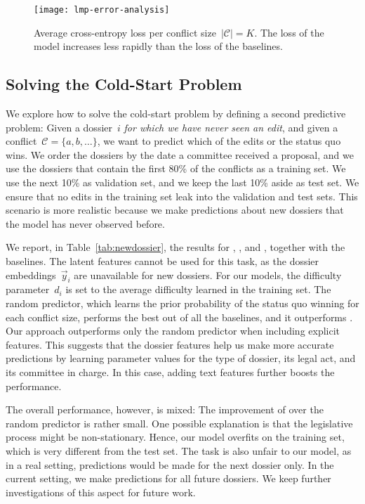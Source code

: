 \begin{figure}
  \centering
  \texttt{[image: lmp-error-analysis]}
	\caption{%
		Average cross-entropy loss per conflict size~$\vert \mathcal{C} \vert = K$.
		The loss of the  model increases less rapidly than the loss of the baselines.
	}
	\label{fig:error-analysis}
\end{figure}

\subsection{Solving the Cold-Start Problem}
\label{sec:cold-start}

We explore how to solve the cold-start problem by defining a second predictive problem:
Given a dossier~$i$ \textit{for which we have never seen an edit}, and given a conflict~$\mathcal{C} = \{a, b, \ldots \}$, we want to predict which of the edits or the status quo wins.
We order the dossiers by the date a committee received a proposal, and we use the dossiers that contain the first 80\% of the conflicts as a training set.
We use the next 10\% as validation set, and we keep the last 10\% aside as test set.
We ensure that no edits in the training set leak into the validation and test sets.
This scenario is more realistic because we make predictions about new dossiers that the model has never observed before.

We report, in Table~\ref{tab:newdossier}, the results for , , and , together with the baselines.
The latent features cannot be used for this task, as the dossier embeddings~$\vec{y}_i$ are unavailable for new dossiers.
For our models, the difficulty parameter~$d_i$ is set to the average difficulty learned in the training set.
The random predictor, which learns the prior probability of the status quo winning for each conflict size, performs the best out of all the baselines, and it outperforms .
Our approach outperforms only the random predictor when including explicit features.
This suggests that the dossier features help us make more accurate predictions by learning parameter values for the type of dossier, its legal act, and its committee in charge.
In this case, adding text features further boosts the performance.

The overall performance, however, is mixed:
The improvement of  over the random predictor is rather small.
One possible explanation is that the legislative process might be non-stationary.
Hence, our model overfits on the training set, which is very different from the test set.
The task is also unfair to our model, as in a real setting, predictions would be made for the next dossier only.
In the current setting, we make predictions for all future dossiers.
We keep further investigations of this aspect for future work.

